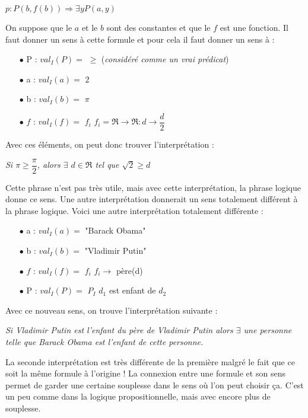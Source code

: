 \begin{center}
$p : P(b,f(b)) \Rightarrow \exists y   P(a,y)$  \\
\vspace{3mm}
\end{center}
On suppose que le $a$ et le $b$ sont des constantes et que le $f$ est une fonction. Il faut donner un sens à cette formule et pour cela il faut donner un sens à : 
\begin{itemize}
\item[$\bullet$]P : $val_{I}(P) = $ $ \geq $ \hspace{3mm} (\textit{considéré comme un vrai prédicat})
\item[$\bullet$] a : $val_{I}(a) = $ $ 2 $ 
\item[$\bullet$] b : $val_{I}(b) = $ $ \pi $ 
\item[$\bullet$] $f$ : $val_{I}(f) = $ $ f_{i} $ \hspace{3mm} $f_{i}= \Re \rightarrow \Re : d \rightarrow \dfrac{d}{2} $ 
\end{itemize}
Avec ces éléments, on peut donc trouver l'interprétation : 
\begin{center}
\textit{Si $\pi \geq  \dfrac{\pi}{2}$, alors $\exists$ $ d \in \Re$ tel que $\sqrt2 \geq d$ }
\end{center}
Cette phrase n'est pas très utile, mais avec cette interprétation, la phrase logique donne ce sens. Une autre interprétation donnerait un sens totalement différent à la phrase logique. Voici une autre interprétation totalement différente :
\begin{itemize}
\item[$\bullet$] a : $val_{I}(a) = $ "Barack Obama"
\item[$\bullet$] b : $val_{I}(b) = $ "Vladimir Putin"
\item[$\bullet$] $f$ : $val_{I}(f) = $ $ f_{i} $ \hspace{3mm} $f_{i} \rightarrow$ père(d) 
\item[$\bullet$] P :  $val_{I}(P) = $ $P_{I}$ \hspace{3mm} $d_{1}$ est enfant de $d_{2}$\\
\end{itemize}

Avec ce nouveau sens, on trouve l'interprétation suivante : 
\begin{center}
\textit{Si Vladimir Putin est l'enfant du père de Vladimir Putin alors $\exists$ une personne telle que Barack Obama est l'enfant de cette personne.}
\end{center}
La seconde interprétation est très différente de la première malgré le fait que ce soit la même formule à l'origine ! La connexion entre une formule et son sens permet de garder une certaine souplesse dans le sens où l'on peut choisir ça. C'est un peu comme dans la logique propositionnelle, mais avec encore plus de souplesse.

